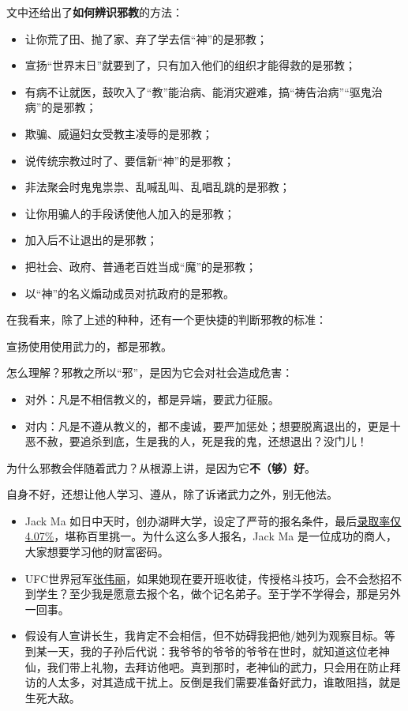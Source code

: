 文中还给出了\textbf{如何辨识邪教}的方法：

\begin{itemize}[nosep, left=\parindent]
    \item 让你荒了田、抛了家、弃了学去信“神”的是邪教；
    \item 宣扬“世界末日”就要到了，只有加入他们的组织才能得救的是邪教；
    \item 有病不让就医，鼓吹入了“教”能治病、能消灾避难，搞“祷告治病”“驱鬼治病”的是邪教；
    \item 欺骗、威逼妇女受教主凌辱的是邪教；
    \item 说传统宗教过时了、要信新“神”的是邪教；
    \item 非法聚会时鬼鬼祟祟、乱喊乱叫、乱唱乱跳的是邪教；
    \item 让你用骗人的手段诱使他人加入的是邪教；
    \item 加入后不让退出的是邪教；
    \item 把社会、政府、普通老百姓当成“魔”的是邪教；
    \item 以“神”的名义煽动成员对抗政府的是邪教。
\end{itemize}

在我看来，除了上述的种种，还有一个更快捷的判断邪教的标准：

\begin{screen}
    宣扬使用使用武力的，都是邪教。
\end{screen}

怎么理解？邪教之所以“邪”，是因为它会对社会造成危害：

\begin{itemize}[nosep, left=\parindent]
    \item 对外：凡是不相信教义的，都是异端，要武力征服。
    \item 对内：凡是不遵从教义的，都不虔诚，要严加惩处；想要脱离退出的，更是十恶不赦，要追杀到底，生是我的人，死是我的鬼，还想退出？没门儿！
\end{itemize}

为什么邪教会伴随着武力？从根源上讲，是因为它\textbf{不（够）好}。

自身不好，还想让他人学习、遵从，除了诉诸武力之外，别无他法。

\begin{itemize}[nosep, left=\parindent]
    \item Jack Ma 如日中天时，创办湖畔大学，设定了严苛的报名条件，最后\href{https://zhuanlan.zhihu.com/p/265168680}{录取率仅4.07\%}，堪称百里挑一。为什么这么多人报名，Jack Ma 是一位成功的商人，大家想要学习他的财富密码。
    \item UFC世界冠军\href{https://baike.baidu.com/item/张伟丽/19688961}{张伟丽}，如果她现在要开班收徒，传授格斗技巧，会不会愁招不到学生？至少我是愿意去报个名，做个记名弟子。至于学不学得会，那是另外一回事。
    \item 假设有人宣讲长生，我肯定不会相信，但不妨碍我把他/她列为观察目标。等到某一天，我的子孙后代说：我爷爷的爷爷的爷爷在世时，就知道这位老神仙，我们带上礼物，去拜访他吧。真到那时，老神仙的武力，只会用在防止拜访的人太多，对其造成干扰上。反倒是我们需要准备好武力，谁敢阻挡，就是生死大敌。
\end{itemize}

